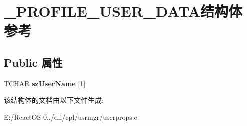 \hypertarget{struct___p_r_o_f_i_l_e___u_s_e_r___d_a_t_a}{}\section{\+\_\+\+P\+R\+O\+F\+I\+L\+E\+\_\+\+U\+S\+E\+R\+\_\+\+D\+A\+T\+A结构体 参考}
\label{struct___p_r_o_f_i_l_e___u_s_e_r___d_a_t_a}
\subsection*{Public 属性}
\begin{DoxyCompactItemize}
\item 
\mbox{\label{struct___p_r_o_f_i_l_e___u_s_e_r___d_a_t_a_afd785e3d7f98026cbaa86df9db635791}} 
T\+C\+H\+AR {\bfseries sz\+User\+Name} \mbox{[}1\mbox{]}
\end{DoxyCompactItemize}


该结构体的文档由以下文件生成\+:\begin{DoxyCompactItemize}
\item 
E\+:/\+React\+O\+S-\/0../dll/cpl/usrmgr/userprops.\+c\end{DoxyCompactItemize}
